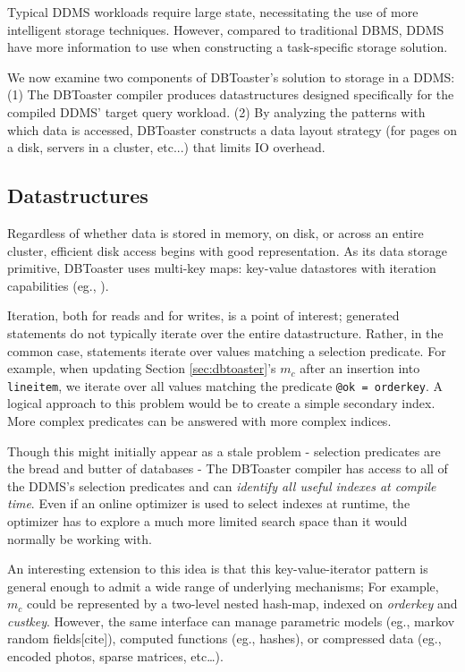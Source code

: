 Typical DDMS workloads require large state, necessitating the use of more intelligent storage techniques.  However, compared to traditional DBMS, DDMS have more information to use when constructing a task-specific storage solution.  

We now examine two components of DBToaster's solution to storage in a DDMS: (1) The DBToaster compiler produces datastructures designed specifically for the compiled DDMS' target query workload. (2) By analyzing the patterns with which data is accessed, DBToaster constructs a data layout strategy (for pages on a disk, servers in a cluster, etc...) that limits IO overhead.

\subsection{Datastructures}
Regardless of whether data is stored in memory, on disk, or across an entire cluster, efficient disk access begins with good representation.  As its data storage primitive, DBToaster uses multi-key maps: key-value datastores with iteration capabilities (eg., \cite{berkeleydb}).  

Iteration, both for reads and for writes, is a point of interest; generated statements do not typically iterate over the entire datastructure.  Rather, in the common case, statements iterate over values matching a selection predicate.  For example, when updating Section \ref{sec:dbtoaster}'s $m_c$ after an insertion into \texttt{lineitem}, we iterate over all values matching the predicate \texttt{@ok = orderkey}.  A logical approach to this problem would be to create a simple secondary index.  More complex predicates can be answered with more complex indices\cite{rangequeries,rstartree,srtree}.

Though this might initially appear as a stale problem - selection predicates are the bread and butter of databases - The DBToaster compiler has access to all of the DDMS's selection predicates and can \textit{identify all useful indexes at compile time}.  Even if an online optimizer is used to select indexes at runtime, the optimizer has to explore a much more limited search space than it would normally be working with.  

An interesting extension to this idea is that this key-value-iterator pattern is general enough to admit a wide range of underlying mechanisms; For example, $m_c$ could be represented by a two-level nested hash-map, indexed on \textit{orderkey} and \textit{custkey}.  However, the same interface can manage parametric models (eg., markov random fields[cite]), computed functions (eg., hashes), or compressed data (eg., encoded photos, sparse matrices, etc\ldots).

